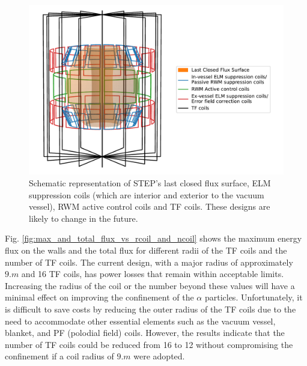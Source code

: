 \documentclass[10pt, a4paper, twoside]{article}
\begin{document}
\begin{figure}[!htb]
    \centering
    \includegraphics[width=0.8\linewidth]{Figures/coil_plot_3d.pdf}
    \caption{Schematic representation of STEP’s last closed flux surface, ELM suppression coils (which are interior and exterior to the vacuum vessel), RWM active control coils and TF coils. These designs are likely to change in the future. 
}
    \label{fig:coil_plot_3d}
\end{figure}

Fig. \ref{fig:max_and_total_flux_vs_rcoil_and_ncoil} shows the maximum energy flux on the walls and the total flux for different radii of the TF coils and the number of TF coils. The current design, with a major radius of approximately $\si{9.m}$ and 16 TF coils, has power losses that remain within acceptable limits. Increasing the radius of the coil or the number beyond these values will have a minimal effect on improving the confinement of the $\alpha$ particles. 
Unfortunately, it is difficult to save costs by reducing the outer radius of the TF coils due to the need to accommodate other essential elements such as the vacuum vessel, blanket, and PF (polodial field) coils. However, the results indicate that the number of TF coils could be reduced from 16 to 12 without compromising the confinement if a coil radius of $\si{9.m}$ were adopted.
\end{document}
